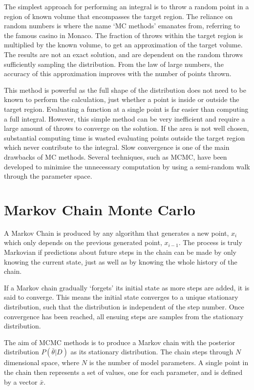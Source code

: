 The simplest approach for performing an integral is to throw a random point in a region of known volume that encompasses the target region. The reliance on random numbers is where the name `MC methods' emanates from, referring to the famous casino in Monaco. The fraction of throws within the target region is multiplied by the known volume, to get an approximation of the target volume. The results are not an exact solution, and are dependent on the random throws sufficiently sampling the distribution. From the law of large numbers, the accuracy of this approximation improves with the number of points thrown. 

This method is powerful as the full shape of the distribution does not need to be known to perform the calculation, just whether a point is inside or outside the target region. Evaluating a function at a single point is far easier than computing a full integral. However, this simple method can be very inefficient and require a large amount of throws to converge on the solution. If the area is not well chosen, substantial computing time is wasted evaluating points outside the target region which never contribute to the integral. Slow convergence is one of the main drawbacks of MC methods. Several techniques, such as MCMC, have been developed to minimise the unnecessary computation by using a semi-random walk through the parameter space.

\section{Markov Chain Monte Carlo}\label{sec:mcmc}

A Markov Chain is produced by any algorithm that generates a new point, $x_i$ which only depends on the previous generated point, $x_{i-1}$. The process is truly Markovian if predictions about future steps in the chain can be made by only knowing the current state, just as well as by knowing the whole history of the chain. 

If a Markov chain gradually `forgets' its initial state as more steps are added, it is said to converge. This means the initial state converges to a unique stationary distribution, such that the distribution is independent of the step number. Once convergence has been reached, all ensuing steps are samples from the stationary distribution.

The aim of MCMC methods is to produce a Markov chain with the posterior distribution $P(\bar{\theta}|D)$ as its stationary distribution. The chain steps through $N$ dimensional space, where $N$ is the number of model parameters. A single point in the chain then represents a set of values, one for each parameter, and is defined by a vector $\bar{x}$.

